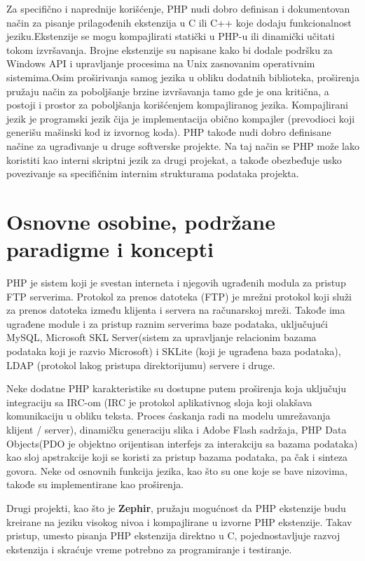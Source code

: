 \documentclass[a4paper]{article}
\begin{document}
{Za specifično i naprednije korišćenje, PHP nudi dobro definisan i dokumentovan način za pisanje prilagođenih ekstenzija u C ili C++ koje dodaju funkcionalnost jeziku.Ekstenzije se mogu kompajlirati statički u PHP-u ili dinamički učitati tokom izvršavanja. Brojne ekstenzije su napisane kako bi dodale podršku za Windows API i upravljanje procesima na Unix zasnovanim operativnim sistemima.Osim proširivanja samog jezika u obliku dodatnih biblioteka, proširenja pružaju način za poboljšanje brzine izvršavanja tamo gde je ona kritična, a postoji i prostor za poboljšanja korišćenjem kompajliranog jezika. Kompajlirani jezik je programski jezik čija je implementacija obično kompajler (prevodioci koji generišu mašinski kod iz izvornog koda). PHP takođe nudi dobro definisane načine za ugrađivanje u druge softverske projekte. Na taj način se PHP može lako koristiti kao interni skriptni jezik za drugi projekat, a takođe obezbeđuje usko povezivanje sa specifičnim internim strukturama podataka projekta.

\section{Osnovne osobine, podržane paradigme i koncepti}
PHP je sistem koji je svestan interneta i njegovih ugrađenih modula za pristup FTP serverima. Protokol za prenos datoteka (FTP) je mrežni protokol koji služi za prenos datoteka između klijenta i servera na računarskoj mreži. Takođe ima ugrađene module i za pristup raznim serverima baze podataka, uključujući MySQL, Microsoft SKL Server(sistem za upravljanje relacionim bazama podataka koji je razvio Microsoft) i SKLite (koji je ugrađena baza podataka), LDAP (protokol lakog pristupa direktorijumu) servere i druge. 

Neke dodatne PHP karakteristike su dostupne putem proširenja koja uključuju integraciju sa IRC-om (IRC je protokol aplikativnog sloja koji olakšava komunikaciju u obliku teksta. Proces ćaskanja radi na modelu umrežavanja klijent / server), dinamičku generaciju slika i Adobe Flash sadržaja, PHP Data Objects(PDO je objektno orijentisan interfejs za interakciju sa bazama podataka) kao sloj apstrakcije koji se koristi za pristup bazama podataka, pa čak i sinteza govora. Neke od osnovnih funkcija jezika, kao što su one koje se bave nizovima, takođe su implementirane kao proširenja\cite{corePHP}.

Drugi projekti, kao što je \textbf{Zephir}\cite{zephir}, pružaju mogućnost da PHP ekstenzije budu kreirane na jeziku visokog nivoa i kompajlirane u izvorne PHP ekstenzije. Takav pristup, umesto pisanja PHP ekstenzija direktno u C, pojednostavljuje razvoj ekstenzija i skraćuje vreme potrebno za programiranje i testiranje. 

}
\end{document}
